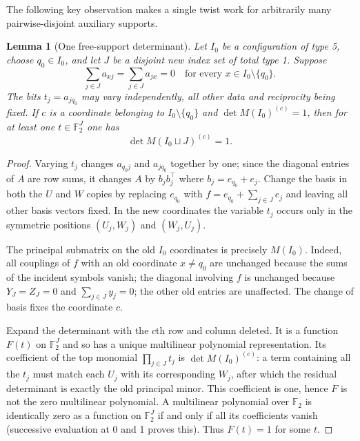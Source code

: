 \documentclass[11pt,a4paper]{article}
\newtheorem{lemma}[theorem]{Lemma}
\theoremstyle{definition}
\newcommand{\FF}{\mathbb F_2}
\begin{document}
The following key observation makes a single twist work
for arbitrarily many pairwise-disjoint auxiliary supports.

\begin{lemma}[One free-support determinant]\label{lem:free}
Let $I_0$ be a configuration of type 5, choose
$q_0\in I_0$, and let $J$ be a disjoint new index set
of total type 1.  Suppose
\[
 \sum_{j\in J}a_{xj}=\sum_{j\in J}a_{jx}=0
           \quad\text{for every }x\in I_0\setminus\{q_0\}.
\]
The bits $t_j=a_{j q_0}$ may vary independently,
all other data and reciprocity being fixed.
If $c$ is a coordinate belonging to $I_0\setminus\{q_0\}$
and $\det M(I_0)^{(c)}=1$, then for at least one
$t\in\FF^J$ one has
\[
                   \det M(I_0\sqcup J)^{(c)}=1.
\]
\end{lemma}
\begin{proof}
Varying $t_j$ changes $a_{q_0j}$ and $a_{jq_0}$
together by one; since the diagonal entries of $A$ are
row sums, it changes $A$ by $b_jb_j^\top$ where
$b_j=e_{q_0}+e_j$.  Change the basis in both the $U$
and $W$ copies by replacing $e_{q_0}$ with
$f=e_{q_0}+\sum_{j\in J}e_j$ and leaving all other
basis vectors fixed.  In the new coordinates the
variable $t_j$ occurs only in the symmetric positions
$(U_j,W_j)$ and $(W_j,U_j)$.

The principal submatrix on the old $I_0$ coordinates
is precisely $M(I_0)$.  Indeed, all couplings of $f$
with an old coordinate $x\ne q_0$ are unchanged because
the sums of the incident symbols vanish; the diagonal
involving $f$ is unchanged because $Y_J=Z_J=0$ and
$\sum_{j\in J}y_j=0$; the other old entries are unaffected.
The change of basis fixes the coordinate $c$.

Expand the determinant with the $c$th row and column
deleted.  It is a function $F(t)$ on $\FF^J$ and so has a
unique multilinear polynomial representation.
Its coefficient of the top monomial
$\prod_{j\in J}t_j$ is $\det M(I_0)^{(c)}$: a term
containing all the $t_j$ must match each $U_j$ with its
corresponding $W_j$, after which the residual determinant
is exactly the old principal minor.  This coefficient
is one, hence $F$ is not the zero multilinear polynomial.
A multilinear polynomial over $\FF$ is identically zero
as a function on $\FF^J$ if and only if all its
coefficients vanish (successive evaluation at 0 and 1
proves this).  Thus $F(t)=1$ for some $t$.
\end{proof}
\end{document}
